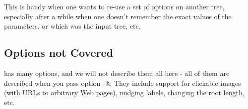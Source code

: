 



\noindent{}This is handy when one wants to re-use a set of options on another
tree, especially after a while when one doesn't remember the exact values of the
parameters, or which was the input tree, etc. 

\subsection{Options not Covered}

\display{} has many options, and we will not describe them all here - all of
them are described when you pass option \texttt{-h}. They include support for
clickable images (with URLs to arbitrary Web pages), nudging labels, changing
the root length, etc. 
